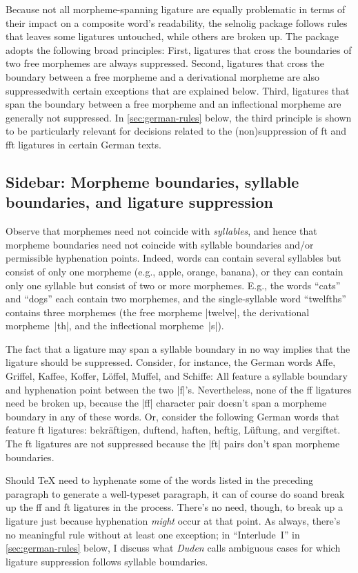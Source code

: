 \documentclass[11pt]{article}
\newcommand{\pkg}[1]{\textsf{#1}}
\begin{document}
Because not all morpheme-spanning ligature are equally problematic in terms of their impact on a composite word's readability, the \pkg{selnolig} package follows rules that leaves some ligatures untouched, while others are broken up. The package adopts the following broad principles: First, ligatures that cross the boundaries of two free morphemes are always suppressed. Second, ligatures that cross the boundary between a free morpheme and a derivational morpheme are also suppressed\textemdash with certain exceptions that are explained below. Third, ligatures that span the boundary between a free morpheme and an inflectional morpheme are generally not suppressed. In \cref{sec:german-rules} below, the third principle is shown to be particularly relevant for decisions related to the (non)suppression of ft and fft ligatures in certain German texts.

\subsection{Sidebar: Morpheme boundaries, syllable boundaries, and ligature suppression}

Observe that morphemes need not coincide with \emph{syllables}, and hence that morpheme boundaries need not coincide with syllable boundaries and/or permissible hyphenation points. Indeed, words can contain several syllables but consist of only one morpheme (e.g., apple, orange, banana), or they can contain only one syllable but consist of two or more morphemes. E.g., the words \enquote{cats} and \enquote{dogs} each contain two morphemes, and the single-syllable word \enquote{twelfths} contains three morphemes (the free morpheme |twelve|, the derivational morpheme~|th|, and the inflectional morpheme~|s|). 

The fact that a ligature may span a syllable boundary in no way implies that the ligature should be suppressed. Consider, for instance, the German words Affe, Griffel, Kaffee, Koffer, Löffel, Muffel, and Schiffe: All feature a syllable boundary and hyphenation point between the two |f|'s. Nevertheless, none of the ff ligatures need be broken up, because the |ff| character pair doesn't span a morpheme boundary in any of these words. Or, consider the following German words that feature ft ligatures: bekräftigen, duftend, haften, heftig, Lüftung, and vergiftet. The ft ligatures are not suppressed because the |ft| pairs don't span morpheme boundaries.

Should TeX need to hyphenate some of the words listed in the preceding paragraph to generate a well-typeset paragraph, it can of course do so\textemdash and break up the ff and ft ligatures in the process. There's no need, though, to break up a ligature just because hyphenation \emph{might} occur at that point. As always, there's no meaningful rule without at least one exception; in \enquote{Interlude~I} in \cref{sec:german-rules} below, I discuss what \emph{Duden} calls ambiguous cases for  which ligature suppression follows syllable boundaries.
\end{document}
